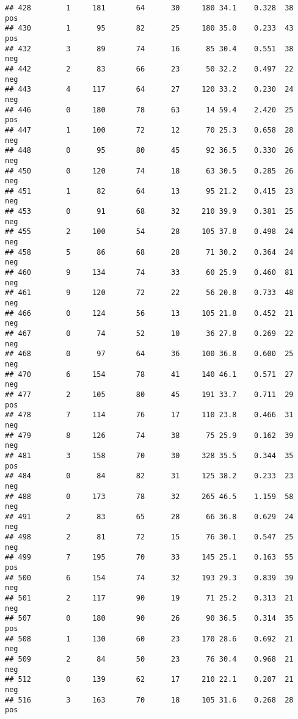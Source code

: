 \documentclass[
]{article}
\begin{document}
\begin{verbatim}
## 428        1     181       64      30     180 34.1    0.328  38      pos
## 430        1      95       82      25     180 35.0    0.233  43      pos
## 432        3      89       74      16      85 30.4    0.551  38      neg
## 442        2      83       66      23      50 32.2    0.497  22      neg
## 443        4     117       64      27     120 33.2    0.230  24      neg
## 446        0     180       78      63      14 59.4    2.420  25      pos
## 447        1     100       72      12      70 25.3    0.658  28      neg
## 448        0      95       80      45      92 36.5    0.330  26      neg
## 450        0     120       74      18      63 30.5    0.285  26      neg
## 451        1      82       64      13      95 21.2    0.415  23      neg
## 453        0      91       68      32     210 39.9    0.381  25      neg
## 455        2     100       54      28     105 37.8    0.498  24      neg
## 458        5      86       68      28      71 30.2    0.364  24      neg
## 460        9     134       74      33      60 25.9    0.460  81      neg
## 461        9     120       72      22      56 20.8    0.733  48      neg
## 466        0     124       56      13     105 21.8    0.452  21      neg
## 467        0      74       52      10      36 27.8    0.269  22      neg
## 468        0      97       64      36     100 36.8    0.600  25      neg
## 470        6     154       78      41     140 46.1    0.571  27      neg
## 477        2     105       80      45     191 33.7    0.711  29      pos
## 478        7     114       76      17     110 23.8    0.466  31      neg
## 479        8     126       74      38      75 25.9    0.162  39      neg
## 481        3     158       70      30     328 35.5    0.344  35      pos
## 484        0      84       82      31     125 38.2    0.233  23      neg
## 488        0     173       78      32     265 46.5    1.159  58      neg
## 491        2      83       65      28      66 36.8    0.629  24      neg
## 498        2      81       72      15      76 30.1    0.547  25      neg
## 499        7     195       70      33     145 25.1    0.163  55      pos
## 500        6     154       74      32     193 29.3    0.839  39      neg
## 501        2     117       90      19      71 25.2    0.313  21      neg
## 507        0     180       90      26      90 36.5    0.314  35      pos
## 508        1     130       60      23     170 28.6    0.692  21      neg
## 509        2      84       50      23      76 30.4    0.968  21      neg
## 512        0     139       62      17     210 22.1    0.207  21      neg
## 516        3     163       70      18     105 31.6    0.268  28      pos

\end{verbatim}
\end{document}
